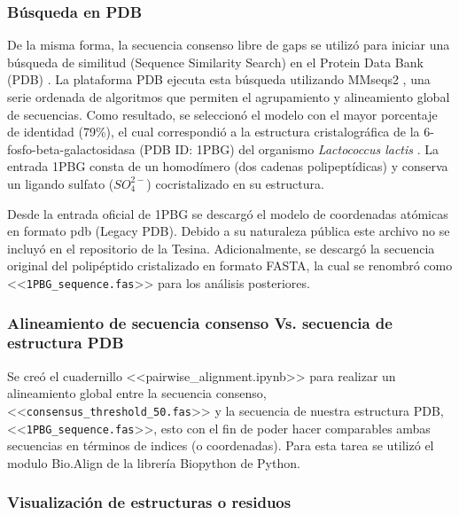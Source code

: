 \subsubsection{Búsqueda en PDB}
De la misma forma, la secuencia consenso libre de gaps se utilizó para iniciar una búsqueda de similitud (Sequence Similarity Search) en el Protein Data Bank (PDB) \parencite{Vallat_2025}. La plataforma PDB ejecuta esta búsqueda utilizando MMseqs2 \parencite{Steinegger_2017}, una serie ordenada de algoritmos que permiten el agrupamiento y alineamiento global de secuencias. Como resultado, se seleccionó el modelo con el mayor porcentaje de identidad (79\%), el cual correspondió a la estructura cristalográfica de la 6-fosfo-beta-galactosidasa (PDB ID: 1PBG) del organismo \textit{Lactococcus lactis} \parencite{Wiesmann_1995}. La entrada 1PBG consta de un homodímero (dos cadenas polipeptídicas) y conserva un ligando sulfato ($SO_4^{2-}$) cocristalizado en su estructura.

Desde la entrada oficial de 1PBG se descargó el modelo de coordenadas atómicas en formato pdb (Legacy PDB). Debido a su naturaleza pública este archivo no se incluyó en el repositorio de la Tesina. Adicionalmente, se descargó la secuencia original del polipéptido cristalizado en formato FASTA, la cual se renombró como <<\texttt{1PBG\_sequence.fas}>> para los análisis posteriores.

\subsubsection{Alineamiento de secuencia consenso Vs. secuencia de estructura PDB}
Se creó el cuadernillo <<pairwise\_alignment.ipynb>> para realizar un alineamiento global entre la secuencia consenso, <<\texttt{consensus\_threshold\_50.fas}>> y la secuencia de nuestra estructura PDB, <<\texttt{1PBG\_sequence.fas}>>, esto con el fin de poder hacer comparables ambas secuencias en términos de indices (o coordenadas). Para esta tarea se utilizó el modulo Bio.Align de la librería Biopython \parencite{Cock_2009} de Python. 


\subsubsection{Visualización de estructuras o residuos}